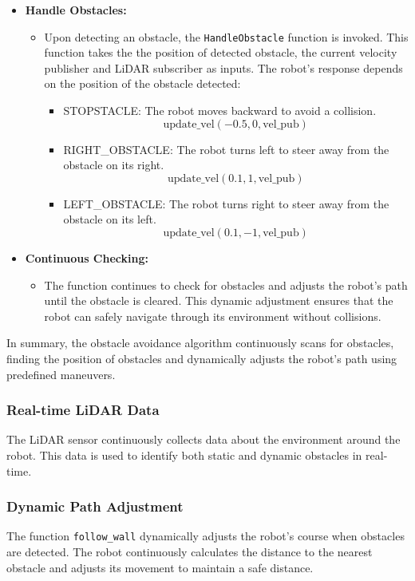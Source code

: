 \documentclass{article}
\begin{document}
\begin{itemize}
		\item \textbf{Handle Obstacles:}
		\begin{itemize}
			\item Upon detecting an obstacle, the \texttt{HandleObstacle} function is invoked. This function takes the the position of detected obstacle, the current velocity publisher and LiDAR subscriber as inputs. The robot's response depends on the position of the obstacle detected:
			\begin{itemize}
				\item STOPSTACLE: The robot moves backward to avoid a collision.
				\[
				\text{update\_vel}(-0.5, 0, \text{vel\_pub})
				\]
				
				\item RIGHT\_OBSTACLE: The robot turns left to steer away from the obstacle on its right.
				\[
				\text{update\_vel}(0.1, 1, \text{vel\_pub})
				\]
				
				\item LEFT\_OBSTACLE: The robot turns right to steer away from the obstacle on its left.
				\[
				\text{update\_vel}(0.1, -1, \text{vel\_pub})
				\]
			\end{itemize}
		\end{itemize}
		
		\item \textbf{Continuous Checking:}
		\begin{itemize}
			\item The function continues to check for obstacles and adjusts the robot's path until the obstacle is cleared. This dynamic adjustment ensures that the robot can safely navigate through its environment without collisions.
		\end{itemize}
		
	\end{itemize}
	
	In summary, the obstacle avoidance algorithm continuously scans for obstacles, finding the position of obstacles and dynamically adjusts the robot's path using predefined maneuvers.
	
	
	\subsubsection{Real-time LiDAR Data}
	The LiDAR sensor continuously collects data about the environment around the robot. This data is used to identify both static and dynamic obstacles in real-time.
	
	\subsubsection{Dynamic Path Adjustment}
	The function \texttt{follow\_wall} dynamically adjusts the robot's course when obstacles are detected. The robot continuously calculates the distance to the nearest obstacle and adjusts its movement to maintain a safe distance.
	
\end{document}
